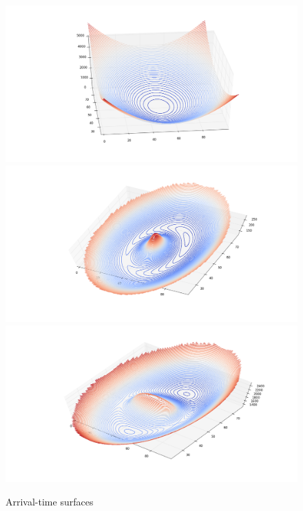\documentclass[12pt,preprint]{aastex}
\begin{document}
\begin{figure}
\includegraphics[height=.3\vsize]{arriv1.png}
\includegraphics[height=.3\vsize]{arriv2.png}
\includegraphics[height=.3\vsize]{arriv3.png}
\caption{Arrival-time surfaces\label{fig:arriv}}
\end{figure}
\end{document}
